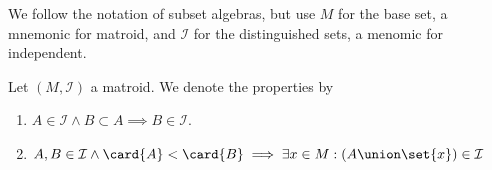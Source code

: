 
We follow the notation of subset algebras, but use $M$ for the base
set, a mnemonic for matroid, and $\mathcal{I}$ for the distinguished
sets, a menomic for independent.

Let $(M, \mathcal{I})$ a matroid.
We denote the properties by
\begin{enumerate}
  \item $A \in \mathcal{I} \land B \subset A \implies B \in \mathcal{I}$.
  \item $A, B \in \mathcal{I} \land \card{A} < \card{B} \implies \exists x \in M: (A \union \set{x}) \in \mathcal{I}$
\end{enumerate}
\strats
